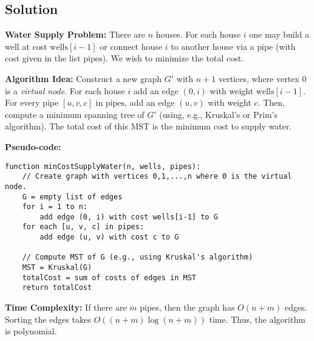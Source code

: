 \documentclass[12pt]{article}
\begin{document}
\subsection*{Solution}
\textbf{Water Supply Problem:}  
There are \(n\) houses. For each house \(i\) one may build a well at cost \(\text{wells}[i-1]\) or connect house \(i\) to another house via a pipe (with cost given in the list \(\text{pipes}\)). We wish to minimize the total cost.

\textbf{Algorithm Idea:}  
Construct a new graph \(G'\) with \(n+1\) vertices, where vertex 0 is a \emph{virtual node}. For each house \(i\) add an edge \((0,i)\) with weight \(\text{wells}[i-1]\). For every pipe \([u,v,c]\) in \(\text{pipes}\), add an edge \((u,v)\) with weight \(c\). Then, compute a minimum spanning tree of \(G'\) (using, e.g., Kruskal's or Prim's algorithm). The total cost of this MST is the minimum cost to supply water.

\textbf{Pseudo-code:}
\begin{verbatim}
function minCostSupplyWater(n, wells, pipes):
    // Create graph with vertices 0,1,...,n where 0 is the virtual node.
    G = empty list of edges
    for i = 1 to n:
        add edge (0, i) with cost wells[i-1] to G
    for each [u, v, c] in pipes:
        add edge (u, v) with cost c to G

    // Compute MST of G (e.g., using Kruskal's algorithm)
    MST = Kruskal(G)
    totalCost = sum of costs of edges in MST
    return totalCost
\end{verbatim}
\textbf{Time Complexity:}  
If there are \(m\) pipes, then the graph has \(O(n+m)\) edges. Sorting the edges takes \(O((n+m)\log (n+m))\) time. Thus, the algorithm is polynomial.

\vspace{0.5cm}

\hrulefill
\end{document}
